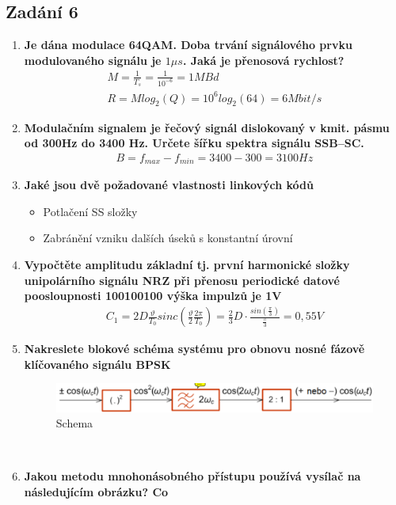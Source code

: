 \subsection{Zadání 6}
\begin{enumerate}
    \item \textbf{Je dána modulace 64QAM. Doba trvání signálového prvku modulovaného signálu je \(1\mu s\). Jaká je přenosová rychlost?}
    \begin{gather*}
        M = \frac{1}{T_s} = \frac{1}{10^{-6}} = 1MBd\\
        R = Mlog_2(Q) = 10^6log_2(64) = 6Mbit/s
    \end{gather*}
    \item \textbf{Modulačním signalem je řečový signál dislokovaný v kmit. pásmu od 300Hz do 3400 Hz.
    Určete šířku spektra signálu SSB–SC.}
    \begin{gather*}
        B = f_{max} - f_{min} = 3400 - 300 = 3100Hz
    \end{gather*}
    \item \textbf{Jaké jsou dvě požadované vlastnosti linkových kódů}
    \begin{itemize}
        \item Potlačení SS složky
        \item Zabránění vzniku dalších úseků s konstantní úrovní
    \end{itemize}
    \item \textbf{Vypočtěte amplitudu základní tj. první harmonické složky unipolárního signálu NRZ při
    přenosu periodické datové poosloupnosti 100100100 výška impulzů je 1V}
    \begin{gather*}
        C_1 = 2D\frac{\vartheta}{T_0}sinc(\frac{\vartheta}{2}\frac{2\pi}{T_0}) = \frac{2}{3}D\cdot \frac{sin(\frac{\pi}{3})}{\frac{\pi}{3}} = 0,55V
    \end{gather*}
    \item \textbf{Nakreslete blokové schéma systému pro obnovu nosné fázově klíčovaného signálu BPSK}
    \begin{figure}[h]
        \centering
        \includegraphics[scale = 0.3]{images/DemodBPSK.png}
        \caption{Schema}
    \end{figure}\\
    \item \textbf{Jakou metodu mnohonásobného přístupu používá vysílač na následujícím obrázku? Co
}
\end{enumerate}
